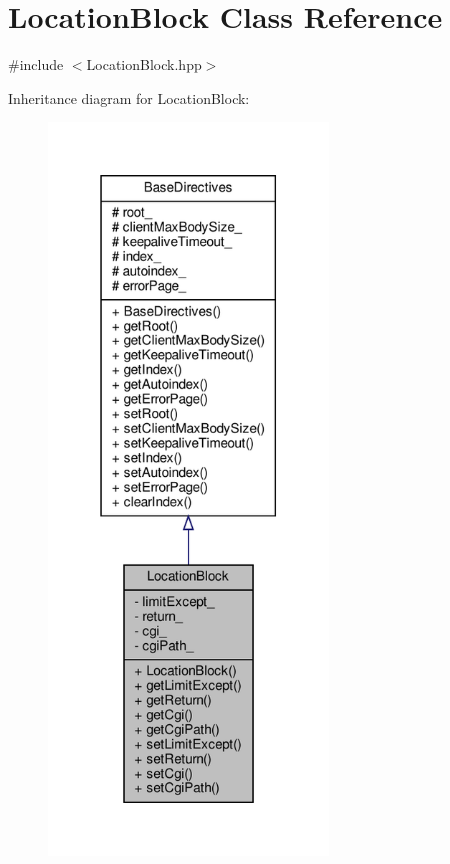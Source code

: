 \hypertarget{classft_1_1_location_block}{}\section{Location\+Block Class Reference}
\label{classft_1_1_location_block}


{\ttfamily \#include $<$Location\+Block.\+hpp$>$}



Inheritance diagram for Location\+Block\+:
\nopagebreak
\begin{figure}[H]
\begin{center}
\leavevmode
\includegraphics[height=550pt]{classft_1_1_location_block__inherit__graph}
\end{center}
\end{figure}



